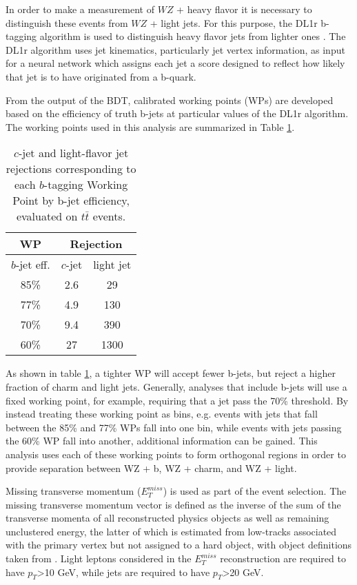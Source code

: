 In order to make a measurement of $WZ$ + heavy flavor it is necessary to distinguish these events from $WZ$ + light jets. For this purpose, the DL1r b-tagging algorithm is used to distinguish heavy flavor jets from lighter ones \cite{btagging}. The DL1r algorithm uses jet kinematics, particularly jet vertex information, as input for a neural network which assigns each jet a score designed to reflect how likely that jet is to have originated from a b-quark. 

From the output of the BDT, calibrated working points (WPs) are developed based on the efficiency of truth b-jets at particular values of the DL1r algorithm. The working points used in this analysis are summarized in Table \ref{tab:btag_WPs}. 

\begin{table}[H] 
\begin{center}
\begin{tabular}{|c|c|c|}
    \hline
    WP & \multicolumn{2}{c|}{Rejection}\\
    \hline
    $b$-jet eff. & $c$-jet & light jet\\
    \hline
    85\% & 2.6 & 29 \\
    77\% & 4.9 & 130 \\
    70\% & 9.4 & 390 \\
    60\% & 27 & 1300 \\ 
    \hline
    \end{tabular}    
    \caption{$c$-jet and light-flavor jet rejections corresponding to each $b$-tagging Working Point by b-jet efficiency, evaluated on $t\bar{t}$ events.}
    \label{tab:btag_WPs}
    \end{center}
\end{table}

As shown in table \ref{tab:btag_WPs}, a tighter WP will accept fewer b-jets, but reject a higher fraction of charm and light jets. Generally, analyses that include b-jets will use a fixed working point, for example, requiring that a jet pass the 70\% threshold. By instead treating these working point as bins, e.g. events with jets that fall between the 85\% and 77\% WPs fall into one bin, while events with jets passing the 60\% WP fall into another, additional information can be gained. This analysis uses each of these working points to form orthogonal regions in order to provide separation between WZ + b, WZ + charm, and WZ + light. 

Missing transverse momentum ($E_T^{miss}$) is used as part of the event selection. The missing transverse momentum vector is defined as the inverse of the sum of the transverse momenta of all reconstructed physics objects as well as remaining unclustered energy, the latter of which is estimated from low-\pt tracks associated with the primary vertex but not assigned to a hard object, with object definitions taken from \cite{met_2018}. Light leptons considered in the $E_T^{miss}$ reconstruction are required to have $p_T$>10 GeV, while jets are required to have $p_T$>20 GeV.

